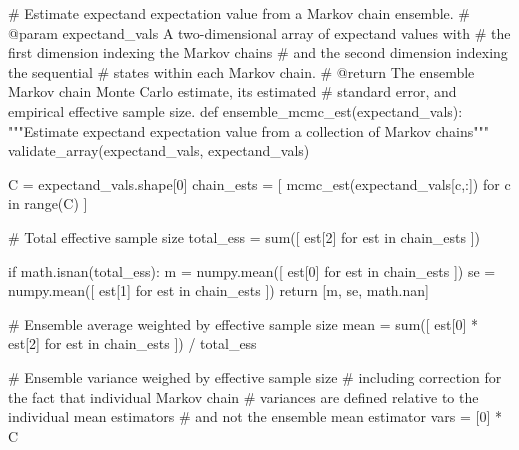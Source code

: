 \documentclass[
  letterpaper,
  DIV=11,
  numbers=noendperiod]{scrartcl}
\newenvironment{Shaded}{\begin{snugshade}}{\end{snugshade}}
\newcommand{\BuiltInTok}[1]{\textcolor[rgb]{0.00,0.23,0.31}{#1}}
\newcommand{\CommentTok}[1]{\textcolor[rgb]{0.37,0.37,0.37}{#1}}
\newcommand{\ControlFlowTok}[1]{\textcolor[rgb]{0.00,0.23,0.31}{#1}}
\newcommand{\DecValTok}[1]{\textcolor[rgb]{0.68,0.00,0.00}{#1}}
\newcommand{\KeywordTok}[1]{\textcolor[rgb]{0.00,0.23,0.31}{#1}}
\newcommand{\NormalTok}[1]{\textcolor[rgb]{0.00,0.23,0.31}{#1}}
\newcommand{\OperatorTok}[1]{\textcolor[rgb]{0.37,0.37,0.37}{#1}}
\newcommand{\StringTok}[1]{\textcolor[rgb]{0.13,0.47,0.30}{#1}}
\begin{document}
\begin{Shaded}
\begin{Highlighting}[]
\CommentTok{\# Estimate expectand expectation value from a Markov chain ensemble.}
\CommentTok{\# @param expectand\_vals A two{-}dimensional array of expectand values with}
\CommentTok{\#                       the first dimension indexing the Markov chains}
\CommentTok{\#                       and the second dimension indexing the sequential}
\CommentTok{\#                       states within each Markov chain.}
\CommentTok{\# @return The ensemble Markov chain Monte Carlo estimate, its estimated}
\CommentTok{\#         standard error, and empirical effective sample size.}
\KeywordTok{def}\NormalTok{ ensemble\_mcmc\_est(expectand\_vals):}
  \CommentTok{"""Estimate expectand expectation value from a collection of}
\CommentTok{     Markov chains"""}
\NormalTok{  validate\_array(expectand\_vals, }\StringTok{\textquotesingle{}expectand\_vals\textquotesingle{}}\NormalTok{)}

\NormalTok{  C }\OperatorTok{=}\NormalTok{ expectand\_vals.shape[}\DecValTok{0}\NormalTok{]}
\NormalTok{  chain\_ests }\OperatorTok{=}\NormalTok{ [ mcmc\_est(expectand\_vals[c,:]) }\ControlFlowTok{for}\NormalTok{ c }\KeywordTok{in} \BuiltInTok{range}\NormalTok{(C) ]}

  \CommentTok{\# Total effective sample size}
\NormalTok{  total\_ess }\OperatorTok{=} \BuiltInTok{sum}\NormalTok{([ est[}\DecValTok{2}\NormalTok{] }\ControlFlowTok{for}\NormalTok{ est }\KeywordTok{in}\NormalTok{ chain\_ests ])}

  \ControlFlowTok{if}\NormalTok{ math.isnan(total\_ess):}
\NormalTok{    m  }\OperatorTok{=}\NormalTok{ numpy.mean([ est[}\DecValTok{0}\NormalTok{] }\ControlFlowTok{for}\NormalTok{ est }\KeywordTok{in}\NormalTok{ chain\_ests ])}
\NormalTok{    se }\OperatorTok{=}\NormalTok{ numpy.mean([ est[}\DecValTok{1}\NormalTok{] }\ControlFlowTok{for}\NormalTok{ est }\KeywordTok{in}\NormalTok{ chain\_ests ])}
    \ControlFlowTok{return}\NormalTok{ [m, se, math.nan]}

  \CommentTok{\# Ensemble average weighted by effective sample size}
\NormalTok{  mean }\OperatorTok{=} \BuiltInTok{sum}\NormalTok{([ est[}\DecValTok{0}\NormalTok{] }\OperatorTok{*}\NormalTok{ est[}\DecValTok{2}\NormalTok{] }\ControlFlowTok{for}\NormalTok{ est }\KeywordTok{in}\NormalTok{ chain\_ests ]) }\OperatorTok{/}\NormalTok{ total\_ess}

  \CommentTok{\# Ensemble variance weighed by effective sample size}
  \CommentTok{\# including correction for the fact that individual Markov chain}
  \CommentTok{\# variances are defined relative to the individual mean estimators}
  \CommentTok{\# and not the ensemble mean estimator}
  \BuiltInTok{vars} \OperatorTok{=}\NormalTok{ [}\DecValTok{0}\NormalTok{] }\OperatorTok{*}\NormalTok{ C}


\end{Highlighting}
\end{Shaded}
\end{document}
